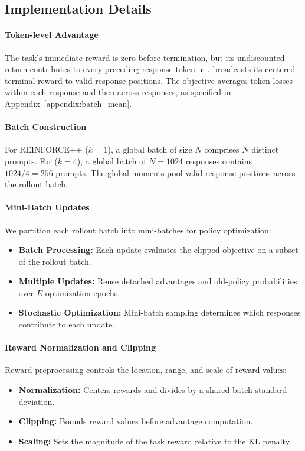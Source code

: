 \subsection{Implementation Details} \label{appendix:tricks}
\paragraph{Token-level Advantage}
The task's immediate reward is zero before termination, but its undiscounted return contributes to every preceding response token in . \varn broadcasts its centered terminal reward to valid response positions. The objective averages token losses within each response and then across responses, as specified in Appendix~\ref{appendix:batch_mean}.

\paragraph{Batch Construction}
For REINFORCE++ ($k=1$), a global batch of size $N$ comprises $N$ distinct prompts. For \varn ($k=4$), a global batch of $N=1024$ responses contains $1024/4=256$ prompts. The global moments pool valid response positions across the rollout batch.

\paragraph{Mini-Batch Updates}
We partition each rollout batch into mini-batches for policy optimization:
\begin{itemize}[leftmargin=*]
    \item \textbf{Batch Processing:} Each update evaluates the clipped objective on a subset of the rollout batch.
    \item \textbf{Multiple Updates:} Reuse detached advantages and old-policy probabilities over $E$ optimization epochs.
    \item \textbf{Stochastic Optimization:} Mini-batch sampling determines which responses contribute to each update.
\end{itemize}

\paragraph{Reward Normalization and Clipping}

Reward preprocessing controls the location, range, and scale of reward values:
\begin{itemize}[leftmargin=*]
    \item \textbf{Normalization:} Centers rewards and divides by a shared batch standard deviation.
    \item \textbf{Clipping:} Bounds reward values before advantage computation.
    \item \textbf{Scaling:} Sets the magnitude of the task reward relative to the KL penalty.
\end{itemize}

